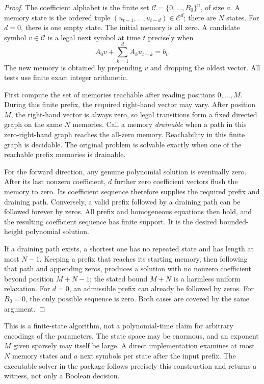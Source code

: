 \documentclass[11pt,letterpaper]{article}
\numberwithin{equation}{section}
\theoremstyle{definition}
\begin{document}
\begin{proof}
The coefficient alphabet is the finite set
$\mathcal C=\{0,\ldots,B_0\}^n$, of size $a$. A memory state is the
ordered tuple $(u_{t-1},\ldots,u_{t-d})\in\mathcal C^d$; there are $N$
states. For $d=0$, there is one empty state. The initial memory is all
zero. A candidate symbol $v\in\mathcal C$ is a legal next symbol at time
$t$ precisely when
\[
 A_0v+\sum_{k=1}^{d}A_k u_{t-k}=b_t.
\]
The new memory is obtained by prepending $v$ and dropping the oldest
vector. All tests use finite exact integer arithmetic.

First compute the set of memories reachable after reading positions
$0,\ldots,M$. During this finite prefix, the required right-hand vector
may vary. After position $M$, the right-hand vector is always zero, so
legal transitions form a fixed directed graph on the same $N$ memories.
Call a memory \emph{drainable} when a path in this zero-right-hand graph
reaches the all-zero memory. Reachability in this finite graph is decidable.
The original problem is solvable exactly when one of the reachable prefix
memories is drainable.

For the forward direction, any genuine polynomial solution is eventually
zero. After its last nonzero coefficient, $d$ further zero coefficient
vectors flush the memory to zero. Its coefficient sequence therefore
supplies the required prefix and draining path. Conversely, a valid
prefix followed by a draining path can be followed forever by zeros.
All prefix and homogeneous equations then hold, and the resulting
coefficient sequence has finite support. It is the desired bounded-height
polynomial solution.

If a draining path exists, a shortest one has no repeated state and has
length at most $N-1$. Keeping a prefix that reaches its starting memory,
then following that path and appending zeros, produces a solution with
no nonzero coefficient beyond position $M+N-1$; the stated bound $M+N$
is a harmless uniform relaxation. For $d=0$, an admissible prefix can
already be followed by zeros. For $B_0=0$, the only possible sequence is
zero. Both cases are covered by the same argument.
\end{proof}

This is a finite-state algorithm, not a polynomial-time claim for arbitrary
encodings of the parameters. The state space may be enormous, and an
exponent $M$ given sparsely may itself be large. A direct implementation
examines at most $N$ memory states and $a$ next symbols per state after
the input prefix. The executable solver in the package follows precisely
this construction and returns a witness, not only a Boolean decision.
\end{document}
